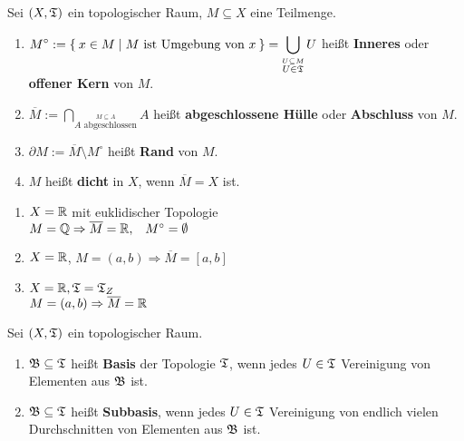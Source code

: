 \begin{definition}
    Sei $(X, \mathfrak{T})$ ein topologischer Raum, $M \subseteq X$ eine Teilmenge.
    \begin{enumerate}[label=\alph*)]
        \item $\displaystyle M^\circ := \Set{x \in M | M \text{ ist Umgebung von } x} = \bigcup_{\stackrel{U \subseteq M} {U \in \mathfrak{T}}} U $ heißt \textbf{Inneres} oder \textbf{ offener Kern} von $M$.  
        \item $\displaystyle \overline{M} := \bigcap_{\stackrel{M \subseteq A}{A \text{ abgeschlossen}}} A$ heißt \textbf{abgeschlossene Hülle} oder \textbf{Abschluss} von $M$. 
        \item $\partial M := \overline{M} \setminus M^\circ$ heißt \textbf{Rand} von $M$. 
        \item $M$ heißt \textbf{dicht} in $X$, wenn $\overline{M} = X$ ist. 
    \end{enumerate}
\end{definition}

\begin{beispiel}
    \begin{enumerate}[label=\arabic*)]
        \item $X = \mathbb{R}$ mit euklidischer Topologie\\
              $M = \mathbb{Q} \Rightarrow \overline{M} = \mathbb{R}, \;\;\; M^\circ = \emptyset$
        \item $X = \mathbb{R}$, $M=(a,b) \Rightarrow \overline{M} = [a,b]$
        \item $X = \mathbb{R}, \mathfrak{T} = \mathfrak{T}_Z$\\
              $M = (a,b) \Rightarrow \overline{M} = \mathbb{R}$
    \end{enumerate}
\end{beispiel}

\begin{definition}  
    Sei $(X, \mathfrak{T})$ ein topologischer Raum.
    \begin{enumerate}[label=\alph*)]
        \item $\mathfrak{B} \subseteq \mathfrak{T}$ heißt \textbf{Basis} der Topologie $\mathfrak{T}$,
              wenn jedes $U \in \mathfrak{T}$ Vereinigung von Elementen aus $\mathfrak{B}$
              ist.
        \item $\mathfrak{B} \subseteq \mathfrak{T}$ heißt \textbf{Subbasis}, wenn jedes
              $U \in \mathfrak{T}$ Vereinigung von endlich vielen Durchschnitten
              von Elementen aus $\mathfrak{B}$ ist.
    \end{enumerate}
\end{definition}

